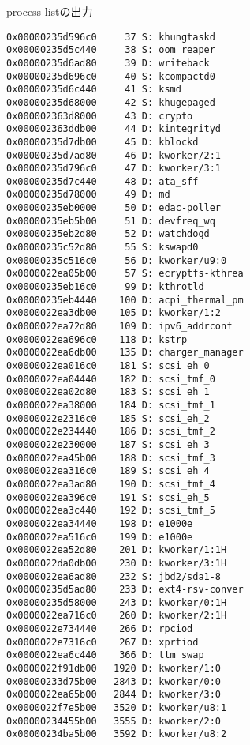 \begin{itembox}[l]{process-listの出力}
\begin{verbatim}
0x00000235d596c0     37 S: khungtaskd
0x00000235d5c440     38 S: oom_reaper
0x00000235d6ad80     39 D: writeback
0x00000235d696c0     40 S: kcompactd0
0x00000235d6c440     41 S: ksmd
0x00000235d68000     42 S: khugepaged
0x000002363d8000     43 D: crypto
0x000002363ddb00     44 D: kintegrityd
0x00000235d7db00     45 D: kblockd
0x00000235d7ad80     46 D: kworker/2:1
0x00000235d796c0     47 D: kworker/3:1
0x00000235d7c440     48 D: ata_sff
0x00000235d78000     49 D: md
0x00000235eb0000     50 D: edac-poller
0x00000235eb5b00     51 D: devfreq_wq
0x00000235eb2d80     52 D: watchdogd
0x00000235c52d80     55 S: kswapd0
0x00000235c516c0     56 D: kworker/u9:0
0x0000022ea05b00     57 S: ecryptfs-kthrea
0x00000235eb16c0     99 D: kthrotld
0x00000235eb4440    100 D: acpi_thermal_pm
0x0000022ea3db00    105 D: kworker/1:2
0x0000022ea72d80    109 D: ipv6_addrconf
0x0000022ea696c0    118 D: kstrp
0x0000022ea6db00    135 D: charger_manager
0x0000022ea016c0    181 S: scsi_eh_0
0x0000022ea04440    182 D: scsi_tmf_0
0x0000022ea02d80    183 S: scsi_eh_1
0x0000022ea38000    184 D: scsi_tmf_1
0x0000022e2316c0    185 S: scsi_eh_2
0x0000022e234440    186 D: scsi_tmf_2
0x0000022e230000    187 S: scsi_eh_3
0x0000022ea45b00    188 D: scsi_tmf_3
0x0000022ea316c0    189 S: scsi_eh_4
0x0000022ea3ad80    190 D: scsi_tmf_4
0x0000022ea396c0    191 S: scsi_eh_5
0x0000022ea3c440    192 D: scsi_tmf_5
0x0000022ea34440    198 D: e1000e
0x0000022ea516c0    199 D: e1000e
0x0000022ea52d80    201 D: kworker/1:1H
0x0000022da0db00    230 D: kworker/3:1H
0x0000022ea6ad80    232 S: jbd2/sda1-8
0x00000235d5ad80    233 D: ext4-rsv-conver
0x00000235d58000    243 D: kworker/0:1H
0x0000022ea716c0    260 D: kworker/2:1H
0x0000022e734440    266 D: rpciod
0x0000022e7316c0    267 D: xprtiod
0x0000022ea6c440    366 D: ttm_swap
0x0000022f91db00   1920 D: kworker/1:0
0x00000233d75b00   2843 D: kworker/0:0
0x0000022ea65b00   2844 D: kworker/3:0
0x0000022f7e5b00   3520 D: kworker/u8:1
0x00000234455b00   3555 D: kworker/2:0
0x00000234ba5b00   3592 D: kworker/u8:2
    \end{verbatim}
\end{itembox}


